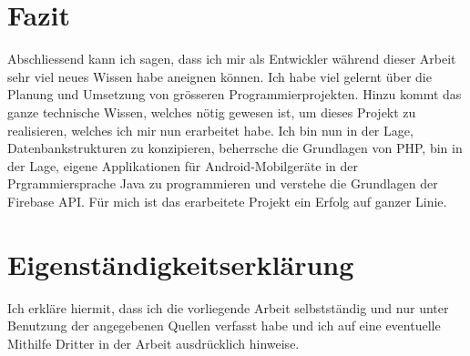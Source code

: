 \documentclass[../main.tex]{subfiles}
\begin{document}
	\section{Fazit}
	Abschliessend kann ich sagen, dass ich mir als Entwickler während dieser Arbeit sehr viel neues Wissen habe aneignen können. Ich habe viel gelernt über die Planung und Umsetzung von grösseren Programmierprojekten. Hinzu kommt das ganze technische  Wissen, welches nötig gewesen ist, um dieses Projekt zu realisieren, welches ich mir nun erarbeitet habe. Ich bin nun in der Lage, Datenbankstrukturen zu konzipieren, beherrsche die Grundlagen von PHP, bin in der Lage, eigene Applikationen für Android-Mobilgeräte in der Prgrammiersprache Java zu programmieren und verstehe die Grundlagen der Firebase API. Für mich ist das erarbeitete Projekt ein Erfolg auf ganzer Linie.
	
	\newpage
	\section*{Eigenständigkeitserklärung}
	Ich erkläre hiermit, dass ich die vorliegende Arbeit selbstständig und nur unter Benutzung der angegebenen Quellen verfasst habe und ich auf eine eventuelle Mithilfe Dritter in der Arbeit ausdrücklich hinweise.
	
\end{document}
